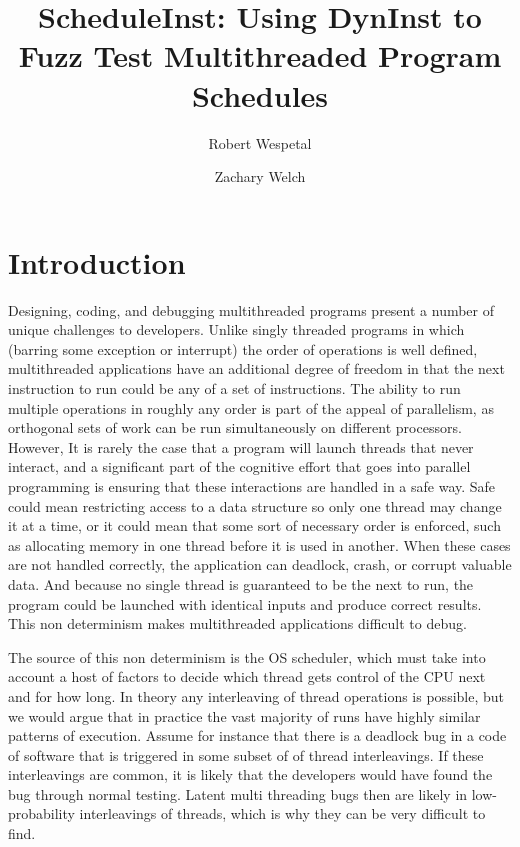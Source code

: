 \documentclass[10pt,]{article} %
\title{ScheduleInst: Using DynInst to Fuzz Test Multithreaded Program Schedules}
\author{Robert Wespetal\\
\and
Zachary Welch}
\begin{document}
\setlength{\baselineskip}{18pt}

\maketitle

\begin{abstract}
\setlength{\baselineskip}{18pt}

 \end{abstract}


\section{Introduction}

Designing, coding, and debugging multithreaded programs present a number of unique challenges to developers.
 Unlike singly threaded programs in which (barring some exception or interrupt) the order of operations is well defined, multithreaded applications have an additional degree of freedom in that the next instruction to run could be any of a set of instructions.
The ability to run multiple operations in roughly any order is part of the appeal of parallelism, as orthogonal sets of work can be run simultaneously on different processors. 
 However, It is rarely the case that a program will launch threads that never interact, and a significant part of the cognitive effort that goes into parallel programming is ensuring that these interactions are handled in a safe way.
 Safe could mean restricting access to a data structure so only one thread may change it at a time, or it could mean that some sort of necessary order is enforced, such as allocating memory in one thread before it is used in another. 
 When these cases are not handled correctly, the application can deadlock, crash, or corrupt valuable data.
  And because no single thread is guaranteed to be the next to run, the program could be launched with identical  inputs and produce correct results. 
 This non determinism makes multithreaded applications difficult to debug.


The source of this non determinism is the OS scheduler, which must take into account a host of factors to decide which thread gets control of the CPU next and for how long.
  In theory any interleaving of thread operations is possible, but we would argue that in practice the vast majority of runs have highly similar patterns of execution. 
 Assume for instance that there is a deadlock bug in a code of software that is triggered in some subset of of thread interleavings. 
If these interleavings are common, it is likely that the developers would have found the bug through normal testing.  
Latent multi threading bugs then are likely in low-probability interleavings of threads, which is why they can be very difficult to find.   
\end{document}
